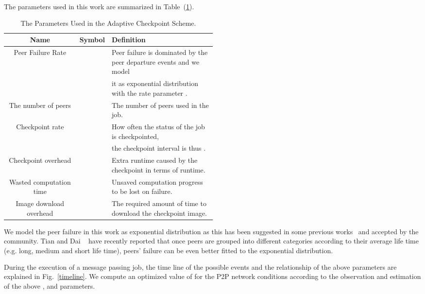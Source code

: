 \documentclass[times, 12pt, onecolumn]{article}
\newcommand{\reffig}[1]{Fig.~\ref{#1}}
\newcommand{\reftab}[1]{Table~(\ref{#1})}
\begin{document}
The parameters used in this work are summarized in \reftab{parameters}.
\begin{table*}[htbp]
\begin{center}
\caption{The Parameters Used in the Adaptive Checkpoint Scheme.}
\label{parameters}
\begin{tabular}{|c|c|p{0.5\linewidth}|}
        \hline
Name                 &  Symbol    & Definition \\
        \hline
Peer Failure Rate    &       & Peer failure is dominated by the peer departure events and we model \\
                     &            & it as exponential distribution~\cite{tianjing07, GhinitaT06} with the rate parameter .  \\
	\hline
The number of peers  &         & The number of peers used in the job. \\
        \hline
Checkpoint rate      &   & How often the status of the job is checkpointed, \\ 
                     &            & the checkpoint interval is thus .  \\
	\hline
Checkpoint overhead  &  	  & Extra runtime caused by the checkpoint in terms of runtime.  \\ 
        \hline
Wasted computation time &  & Unsaved computation progress to be lost on failure. \\
        \hline
Image download overhead &     & The required amount of time to download the checkpoint image.\\ 
	\hline
\end{tabular} 
\end{center}

\end{table*}

We model the peer failure in this work as exponential distribution as this has
been suggested in some previous works~\cite{tianjing07, GhinitaT06} and accepted
by the community. Tian and Dai ~\cite{tianjing07} have recently reported that once 
peers are grouped into different categories according to their average life time (e.g. 
long, medium and short life time), peers' failure can be even better fitted to the 
exponential distribution. 

During the execution of a message passing job, the time line of the possible
events and the relationship of the above parameters are explained in
\reffig{timeline}. We compute an optimized value of  for the P2P
network conditions according to the observation and estimation of the above
,  and  parameters.
\end{document}
